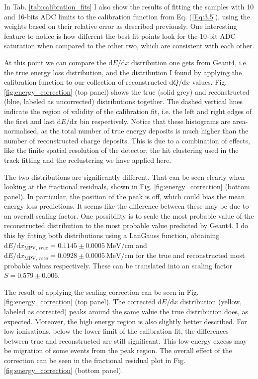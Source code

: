 In Tab. \ref{tab:calibration_fits} I also show the results of fitting the samples with 10 and 16-bits ADC limits to the calibration function from Eq. (\ref{Eq:3.5}), using the weights based on their relative error as described previously. One interesting feature to notice is how different the best fit points look for the 10-bit ADC saturation when compared to the other two, which are consistent with each other.

At this point we can compare the $\mathrm{d}E/\mathrm{d}x$ distribution one gets from Geant4, i.e. the true energy loss distribution, and the distribution I found by applying the calibration function to our collection of reconstructed $\mathrm{d}Q/\mathrm{d}x$ values. Fig. \ref{fig:energy_correction} (top panel) shows the true (solid grey) and reconstructed (blue, labeled as uncorrected) distributions together. The dashed vertical lines indicate the region of validity of the calibration fit, i.e. the left and right edges of the first and last $\mathrm{d}E/\mathrm{d}x$ bin respectively. Notice that these histograms are area-normalised, as the total number of true energy deposits is much higher than the number of reconstructed charge deposits. This is due to a combination of effects, like the finite spatial resolution of the detector, the hit clustering used in the track fitting and the reclustering we have applied here.

The two distributions are significantly different. That can be seen clearly when looking at the fractional residuals, shown in Fig. \ref{fig:energy_correction} (bottom panel). In particular, the position of the peak is off, which could bias the mean energy loss predictions. It seems like the difference between these may be due to an overall scaling factor. One possibility is to scale the most probable value of the reconstructed distribution to the most probable value predicted by Geant4. I do this by fitting both distributions using a LanGauss function, obtaining $\mathrm{d}E/\mathrm{d}x_{\mathrm{MPV}, ~true} = 0.1145\pm0.0005~\mathrm{MeV}/\mathrm{cm}$ and $\mathrm{d}E/\mathrm{d}x_{\mathrm{MPV}, ~reco} = 0.0928\pm0.0005~\mathrm{MeV}/\mathrm{cm}$ for the true and reconstructed most probable values respectively. These can be translated into an scaling factor $S=0.579\pm0.006$.

The result of applying the scaling correction can be seen in Fig. \ref{fig:energy_correction} (top panel). The corrected $\mathrm{d}E/\mathrm{d}x$ distribution (yellow, labeled as corrected) peaks around the same value the true distribution does, as expected. Moreover, the high energy region is also slightly better described. For low ionisations, below the lower limit of the calibration fit, the differences between true and reconstructed are still significant. This low energy excess may be migration of some events from the peak region. The overall effect of the correction can be seen in the fractional residual plot in Fig. \ref{fig:energy_correction} (bottom panel).

